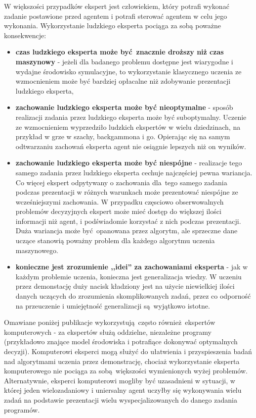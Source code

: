 W większości przypadków ekspert jest człowiekiem, który potrafi wykonać zadanie postawione przed agentem i potrafi sterować agentem w celu jego wykonania. Wykorzystanie ludzkiego eksperta pociąga za sobą poważne konsekwencje:
\begin{itemize}
\item \textbf{czas ludzkiego eksperta może być znacznie droższy niż czas maszynowy} - jeżeli dla badanego problemu dostępne jest wiarygodne i wydajne środowisko symulacyjne, to wykorzystanie klasycznego uczenia ze wzmocnieniem może być bardziej opłacalne niż zdobywanie prezentacji ludzkiego eksperta,
\item \textbf{zachowanie ludzkiego eksperta może być nieoptymalne} - sposób realizacji zadania przez ludzkiego eksperta może być suboptymalny. Uczenie ze wzmocnieniem wyprzedziło ludzkich ekspertów w wielu dziedzinach, na przykład w grze w szachy, backgammona i go. Opierając się na samym odtwarzaniu zachowań eksperta agent nie osiągnie lepszych niż on wyników.
\item \textbf{zachowanie ludzkiego eksperta może być niespójne} - realizacje tego samego zadania przez ludzkiego eksperta cechuje najczęściej pewna wariancja. Co więcej ekspert odpytywany o zachowania dla tego samego zadania podczas prezentacji w różnych warunkach może prezentować niespójne ze wcześniejszymi zachowania. W przypadku częsciowo obserwowalnych problemów decyzyjnych ekspert może mieć dostęp do większej ilości informacji niż agent, i podświadomie korzystać z nich podczas prezentacji. Duża wariancja może być opanowana przez algorytm, ale sprzeczne dane uczące stanowią poważny problem dla każdego algorytmu uczenia maszynowego.
\item  \textbf{konieczne jest zrozumienie ,,idei'' za zachowaniami eksperta} - jak w każdym problemie uczenia, konieczna jest generalizacja wiedzy. W uczeniu przez demonstację duży nacisk kładziony jest na użycie niewielkiej ilości danych uczących do zrozumienia skomplikowanych zadań, przez co odporność na przeuczenie i umiejętność generalizacji są wyjątkowo istotne.
\end{itemize}   

Omawiane poniżej publikacje wykorzystują często również ekspertów komputerowych - za ekspertów służą oddzielne, niezależne programy (przykładowo znające model środowiska i potrafiące dokonywać optymalnych decyzji). Komputerowi eksperci mogą służyć do ułatwienia i przyspieszenia badań nad algorytmami uczenia przez demonstrację, chociaż wykorzystanie eksperta komputerowego nie pociąga za sobą większości wymienionych wyżej problemów. Alternatywnie, eksperci komputerowi mogliby być uzasadnieni w sytuacji, w której jeden wielozadaniowy i uniersalny agent uczyłby się wykonywania wielu zadań na podstawie prezentacji wielu wyspecjalizowanych do danego zadania programów.

